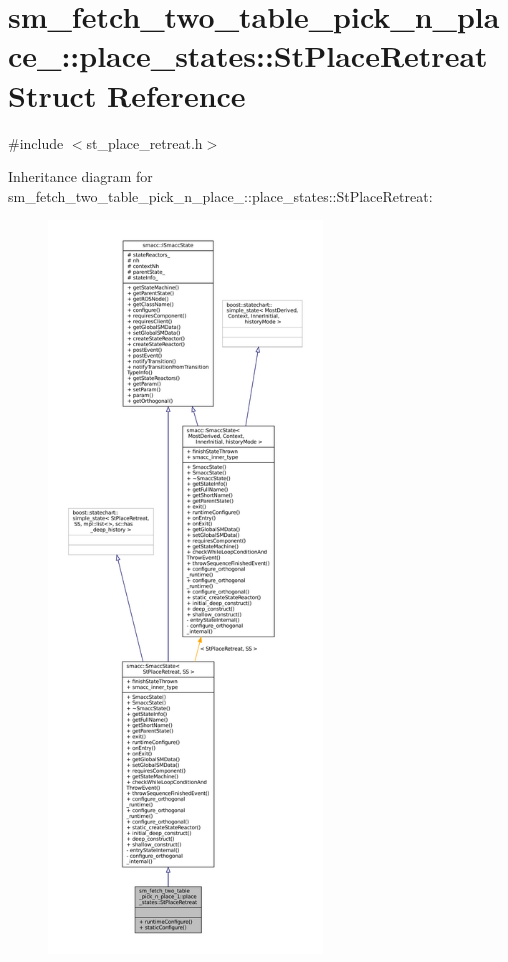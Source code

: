 \hypertarget{structsm__fetch__two__table__pick__n__place__1_1_1place__states_1_1StPlaceRetreat}{}\section{sm\+\_\+fetch\+\_\+two\+\_\+table\+\_\+pick\+\_\+n\+\_\+place\+\_\+:\+:place\+\_\+states\+:\+:St\+Place\+Retreat Struct Reference}
\label{structsm__fetch__two__table__pick__n__place__1_1_1place__states_1_1StPlaceRetreat}


{\ttfamily \#include $<$st\+\_\+place\+\_\+retreat.\+h$>$}



Inheritance diagram for sm\+\_\+fetch\+\_\+two\+\_\+table\+\_\+pick\+\_\+n\+\_\+place\+\_\+:\+:place\+\_\+states\+:\+:St\+Place\+Retreat\+:
\nopagebreak
\begin{figure}[H]
\begin{center}
\leavevmode
\includegraphics[height=550pt]{structsm__fetch__two__table__pick__n__place__1_1_1place__states_1_1StPlaceRetreat__inherit__graph}
\end{center}
\end{figure}


